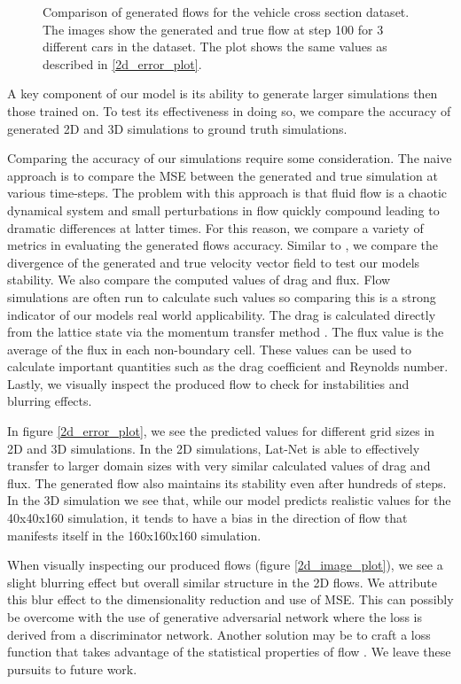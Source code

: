 \documentclass{article}
\begin{document}
\begin{figure}[!t]
\caption{Comparison of generated flows for the vehicle cross section dataset. The images show the generated and true flow at step 100 for 3 different cars in the dataset. The plot shows the same values as described in \ref{2d_error_plot}.}
\label{car_dataset}
\end{figure}


A key component of our model is its ability to generate larger simulations then those trained on. To test its effectiveness in doing so, we compare the accuracy of generated 2D and 3D simulations to ground truth simulations.

Comparing the accuracy of our simulations require some consideration. The naive approach is to compare the MSE between the generated and true simulation at various time-steps. The problem with this approach is that fluid flow is a chaotic dynamical system and small perturbations in flow quickly compound leading to dramatic differences at latter times. For this reason, we compare a variety of metrics in evaluating the generated flows accuracy. Similar to \cite{tompson2016accelerating}, we compare the divergence of the generated and true velocity vector field to test our models stability. We also compare the computed values of drag and flux. Flow simulations are often run to calculate such values so comparing this is a strong indicator of our models real world applicability. The drag is calculated directly from the lattice state via the momentum transfer method \cite{guo2013lattice}. The flux value is the average of the flux in each non-boundary cell. These values can be used to calculate important quantities such as the drag coefficient and Reynolds number. Lastly, we visually inspect the produced flow to check for instabilities and blurring effects.

In figure \ref{2d_error_plot}, we see the predicted values for different grid sizes in 2D and 3D simulations. In the 2D simulations, Lat-Net is able to effectively transfer to larger domain sizes with very similar calculated values of drag and flux. The generated flow also maintains its stability even after hundreds of steps. In the 3D simulation we see that, while our model predicts realistic values for the 40x40x160 simulation, it tends to have a bias in the direction of flow that manifests itself in the 160x160x160 simulation.

When visually inspecting our produced flows (figure \ref{2d_image_plot}), we see a slight blurring effect but overall similar structure in the 2D flows. We attribute this blur effect to the dimensionality reduction and use of MSE. This can possibly be overcome with the use of generative adversarial network \cite{goodfellow2014generative} where the loss is derived from a discriminator network. Another solution may be to craft a loss function that takes advantage of the statistical properties of flow \cite{kim2008wavelet}. We leave these pursuits to future work.
\end{document}
